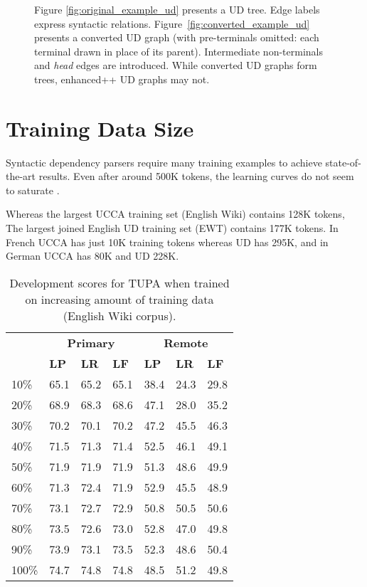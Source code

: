 \documentclass[11pt,a4paper]{article}
\begin{document}
\begin{figure}[!ht]
\caption{Figure \ref{fig:original_example_ud} presents a UD tree.
  Edge labels express syntactic relations.
Figure~\ref{fig:converted_example_ud} presents a converted UD graph
(with pre-terminals omitted: each terminal drawn in place of its parent).
Intermediate non-terminals and \textit{head} edges are introduced.
While converted UD graphs form trees, enhanced++ UD graphs may not.}\label{fig:ud_examples}
\end{figure}


\section{Training Data Size}\label{sec:data_size}

Syntactic dependency parsers require many training examples to achieve
state-of-the-art results.
Even after around 500K tokens, the learning curves do not seem to saturate
\cite{de2017old,velldal2017joint}.

Whereas the largest UCCA training set (English Wiki) contains 128K tokens,
The largest joined English UD training set (EWT) contains 177K tokens.
In French UCCA has just 10K training tokens whereas UD has 295K,
and in German UCCA has 80K and UD 228K.

\begin{table}[t]
\centering
\begin{tabular}{l|lll|lll}
& \multicolumn{3}{c|}{\footnotesize \bf Primary} & \multicolumn{3}{c}{\footnotesize \bf Remote} \\
& \footnotesize \textbf{LP} & \footnotesize \textbf{LR} & \footnotesize \textbf{LF}
& \footnotesize \textbf{LP} & \footnotesize \textbf{LR} & \footnotesize \textbf{LF} \\
\hline
\footnotesize 10\% & 65.1 & 65.2 & 65.1 & 38.4 & 24.3 & 29.8\\
\footnotesize 20\% & 68.9 & 68.3 & 68.6 & 47.1 & 28.0 & 35.2\\
\footnotesize 30\% & 70.2 & 70.1 & 70.2 & 47.2 & 45.5 & 46.3\\
\footnotesize 40\% & 71.5 & 71.3 & 71.4 & 52.5 & 46.1 & 49.1\\
\footnotesize 50\% & 71.9 & 71.9 & 71.9 & 51.3 & 48.6 & 49.9\\
\footnotesize 60\% & 71.3 & 72.4 & 71.9 & 52.9 & 45.5 & 48.9\\
\footnotesize 70\% & 73.1 & 72.7 & 72.9 & 50.8 & 50.5 & 50.6\\
\footnotesize 80\% & 73.5 & 72.6 & 73.0 & 52.8 & 47.0 & 49.8\\
\footnotesize 90\% & 73.9 & 73.1 & 73.5 & 52.3 & 48.6 & 50.4\\
\footnotesize 100\% & 74.7 & 74.8 & 74.8 & 48.5 & 51.2 & 49.8\\
\end{tabular}
\caption{
Development scores for TUPA \protect\cite{hershcovich2017a} when trained on increasing amount of training data
(English Wiki corpus).
\label{tab:partial_data_results}}
\end{table}
\end{document}
